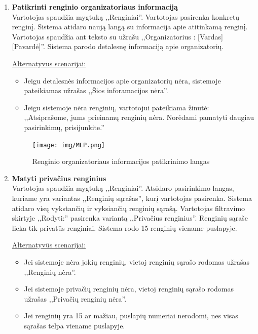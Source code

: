 \documentclass{VUMIFPSkursinis}
\begin{document}
\begin{enumerate} [label = \textbf{U\arabic*.}]
				\begin{figure}[H]
					\centering
					\texttt{[image: img/MLP.png]}
					\caption{Prisijungimo prie viešo renginio langas}
					\label{fig:prisijungti-prie-vieso-renginio}
				\end{figure}

			\item \textbf{Patikrinti renginio organizatoriaus informaciją} \\
				Vartotojas spaudžia mygtuką ,,Renginiai''. 
				Vartotojas pasirenka konkretų renginį. 
				Sistema atidaro naują langą su informacija apie atitinkamą renginį. 
				Vartotojas spaudžia ant teksto su užrašu ,,Organizatorius : [Vardas] [Pavardė]''.
				Sistema parodo detalesnę informaciją apie organizatorių.
				
				\underline{Alternatyvūs scenarijai:}
				\begin{itemize}
					\item Jeigu detalesnės informacijos apie organizatorių nėra, sistemoje pateikiamas užrašas ,,Šios inforamacijos nėra''.
					\item Jeigu sistemoje nėra renginių, vartotojui pateikiama žinutė:
					,,Atsiprašome, jums prieinamų renginių nėra. Norėdami pamatyti daugiau pasirinkimų, prisijunkite.''
				\end{itemize}

				\begin{figure}[H]
					\centering
					\texttt{[image: img/MLP.png]}
					\caption{Renginio organizatoriaus informacijos patikrinimo langas}
					\label{fig:patikrinti-renginio-organizatoriaus-informacija}
				\end{figure}
			
			\item \textbf{Matyti privačius renginius} \\
				Vartotojas spaudžia mygtuką ,,Renginiai''.
				Atsidaro pasirinkimo langas, kuriame yra variantas ,,Renginių sąrašas'', kurį vartotojas pasirenka.
				Sistema atidaro visų vykstančių ir vyksiančių renginių sąrašą.
				Vartotojas filtravimo skirtyje ,,Rodyti:'' pasirenka variantą ,,Privačius renginius''.
				Renginių sąraše lieka tik privatūs renginiai.
				Sistema rodo 15 renginių viename puslapyje.
				
				\underline{Alternatyvūs scenarijai:}
				\begin{itemize}
					\item Jei sistemoje nėra jokių renginių, vietoj renginių sąrašo rodomas užrašas ,,Renginių nėra''.
					\item Jei sistemoje privačių renginių nėra, vietoj renginių sąrašo rodomas užrašas ,,Privačių renginių nėra''.
					\item Jei renginių yra 15 ar mažiau, puslapių numeriai nerodomi, nes visas sąrašas telpa viename puslapyje.
				\end{itemize}
			

\end{enumerate}
\end{document}

